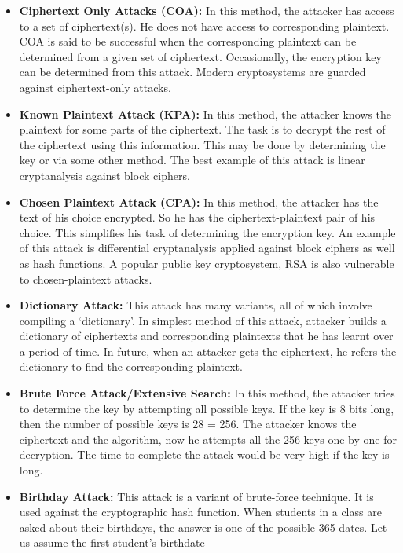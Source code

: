 \documentclass[11pt]{article}
\begin{document}
\begin{itemize}
\item
  \textbf{Ciphertext Only Attacks (COA):} In this method, the attacker
  has access to a set of ciphertext(s). He does not have access to
  corresponding plaintext. COA is said to be successful when the
  corresponding plaintext can be determined from a given set of
  ciphertext. Occasionally, the encryption key can be determined from
  this attack. Modern cryptosystems are guarded against ciphertext-only
  attacks.
\item
  \textbf{Known Plaintext Attack (KPA):} In this method, the attacker
  knows the plaintext for some parts of the ciphertext. The task is to
  decrypt the rest of the ciphertext using this information. This may be
  done by determining the key or via some other method. The best example
  of this attack is linear cryptanalysis against block ciphers.
\item
  \textbf{Chosen Plaintext Attack (CPA):} In this method, the attacker
  has the text of his choice encrypted. So he has the
  ciphertext-plaintext pair of his choice. This simplifies his task of
  determining the encryption key. An example of this attack is
  differential cryptanalysis applied against block ciphers as well as
  hash functions. A popular public key cryptosystem, RSA is also
  vulnerable to chosen-plaintext attacks.
\item
  \textbf{Dictionary Attack:} This attack has many variants, all of
  which involve compiling a `dictionary'. In simplest method of this
  attack, attacker builds a dictionary of ciphertexts and corresponding
  plaintexts that he has learnt over a period of time. In future, when
  an attacker gets the ciphertext, he refers the dictionary to find the
  corresponding plaintext.
\item
  \textbf{Brute Force Attack/Extensive Search:} In this method, the
  attacker tries to determine the key by attempting all possible keys.
  If the key is 8 bits long, then the number of possible keys is 28 =
  256. The attacker knows the ciphertext and the algorithm, now he
  attempts all the 256 keys one by one for decryption. The time to
  complete the attack would be very high if the key is long.
\item
  \textbf{Birthday Attack:} This attack is a variant of brute-force
  technique. It is used against the cryptographic hash function. When
  students in a class are asked about their birthdays, the answer is one
  of the possible 365 dates. Let us assume the first student's birthdate

\end{itemize}
\end{document}
